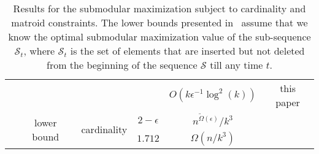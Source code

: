 \documentclass[11pt]{article}
\newcommand{\mO}{O}
\begin{document}
\begin{table*}[h]
\begin{center}
\begin{tabular}{|c|c|c|c|c|c|}
        &  &&   &  $\mO(k\epsilon^{-1}\log^2(k))$  & this paper  \\
 
        \cline{2-6}
  
        &  \multirow{2}{*}{lower bound} & \multirow{2}{*}{cardinality}& $2-\epsilon$ & $n^{\tilde{\Omega}(\epsilon)}/k^3$  & \cite{DBLP:journals/corr/abs-2111-03198} \\
  
        &   && $1.712$ & $\Omega(n/k^3)$   & \cite{DBLP:journals/corr/abs-2111-03198} \\
        \hline
\end{tabular}
\end{center}
\caption{Results for the submodular maximization subject to cardinality  and matroid 
constraints. The lower bounds presented in~\cite{DBLP:journals/corr/abs-2111-03198} assume that we 
know the optimal submodular maximization value of the sub-sequence $\mathcal{S}_t$,  
where $\mathcal{S}_t$ is the set of elements that are inserted but not deleted from the beginning of the sequence $\mathcal{S}$ 
till any time $t$. 
}
\vspace{-0.4cm} 
\label{table:summary}
\end{table*}

\medskip
\end{document}
